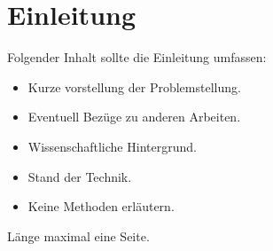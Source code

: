 \chapter{Einleitung}
\label{cha:einleitung}

Folgender Inhalt sollte die Einleitung umfassen:

\begin{itemize}
  \item Kurze vorstellung der Problemstellung.
  \item Eventuell Bez\"uge zu anderen Arbeiten.
  \item Wissenschaftliche Hintergrund.
  \item Stand der Technik.
  \item Keine Methoden erl\"autern.
\end{itemize}

L\"ange maximal eine Seite.
